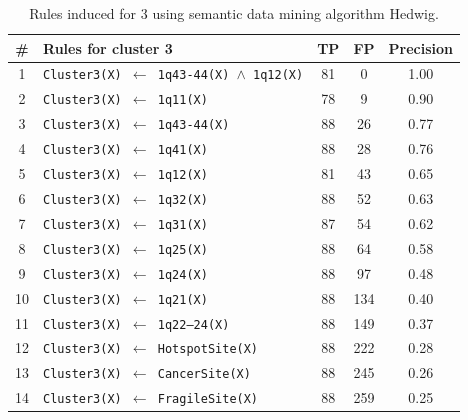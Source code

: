 \begin{table}[bt]
\centering
\begin{tabular}{clccc}\hline
\textbf{\#} & \textbf{Rules for cluster 3} & \textbf{TP} & \textbf{FP} & \textbf{Precision}\\\hline
1 & \texttt{Cluster3(X) $\leftarrow$ 1q43-44(X) $\wedge$ 1q12(X)} & 81 & 0 & 1.00  \\
2 & \texttt{Cluster3(X) $\leftarrow$ 1q11(X)} & 78 & 9 & 0.90  \\
3 & \texttt{Cluster3(X) $\leftarrow$ 1q43-44(X)} & 88 & 26 & 0.77  \\
4 & \texttt{Cluster3(X) $\leftarrow$ 1q41(X)} & 88 & 28 & 0.76  \\
5 & \texttt{Cluster3(X) $\leftarrow$ 1q12(X)} & 81 & 43 & 0.65  \\
6 & \texttt{Cluster3(X) $\leftarrow$ 1q32(X)} & 88 & 52 & 0.63  \\
7 & \texttt{Cluster3(X) $\leftarrow$ 1q31(X)} & 87 & 54 & 0.62  \\
8 & \texttt{Cluster3(X) $\leftarrow$ 1q25(X)} & 88 & 64 & 0.58  \\
9 & \texttt{Cluster3(X) $\leftarrow$ 1q24(X)} & 88 & 97 & 0.48  \\
10 & \texttt{Cluster3(X) $\leftarrow$ 1q21(X)} & 88 & 134 & 0.40  \\
11 & \texttt{Cluster3(X) $\leftarrow$ 1q22--24(X)} & 88 & 149 & 0.37  \\
12 & \texttt{Cluster3(X) $\leftarrow$ HotspotSite(X)} & 88 & 222 & 0.28 \\
13 & \texttt{Cluster3(X) $\leftarrow$ CancerSite(X)} & 88 & 245 & 0.26 \\
14 & \texttt{Cluster3(X) $\leftarrow$ FragileSite(X)} & 88 & 259 & 0.25 \\
\hline
\end{tabular}
\caption{Rules induced for 3 using semantic data mining algorithm Hedwig.}
\label{Tab:clus3rules}
\end{table}


